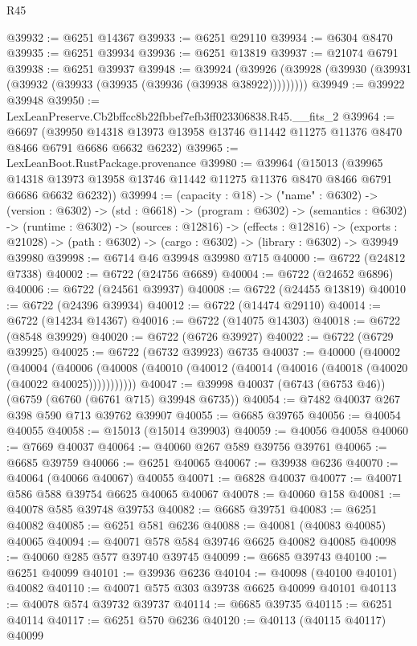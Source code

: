 \begin{lexlean}{R45}
\begin{coremodule}
{@39932 := @6251 @14367
@39933 := @6251 @29110
@39934 := @6304 @8470
@39935 := @6251 @39934
@39936 := @6251 @13819
@39937 := @21074 @6791
@39938 := @6251 @39937
@39948 := @39924
    (@39926 (@39928 (@39930 (@39931 (@39932 (@39933 (@39935 (@39936 (@39938 @38922)))))))))
@39949 := @39922 @39948
@39950 := LexLeanPreserve.Cb2bffcc8b22fbbef7efb3ff023306838.R45.__fits_2
@39964 := @6697
    (@39950 @14318 @13973 @13958 @13746 @11442 @11275 @11376 @8470 @8466 @6791 @6686 @6632 @6232)
@39965 := LexLeanBoot.RustPackage.provenance
@39980 := @39964
    (@15013
      (@39965 @14318 @13973 @13958 @13746 @11442 @11275 @11376 @8470 @8466 @6791 @6686 @6632 @6232))
@39994 := (capacity : @18) ->
  ("name" : @6302) ->
  (version : @6302) ->
  (std : @6618) ->
  (program : @6302) ->
  (semantics : @6302) ->
  (runtime : @6302) ->
  (sources : @12816) ->
  (effects : @12816) ->
  (exports : @21028) -> (path : @6302) -> (cargo : @6302) -> (library : @6302) -> @39949 @39980
@39998 := @6714 @46 @39948 @39980 @715
@40000 := @6722 (@24812 @7338)
@40002 := @6722 (@24756 @6689)
@40004 := @6722 (@24652 @6896)
@40006 := @6722 (@24561 @39937)
@40008 := @6722 (@24455 @13819)
@40010 := @6722 (@24396 @39934)
@40012 := @6722 (@14474 @29110)
@40014 := @6722 (@14234 @14367)
@40016 := @6722 (@14075 @14303)
@40018 := @6722 (@8548 @39929)
@40020 := @6722 (@6726 @39927)
@40022 := @6722 (@6729 @39925)
@40025 := @6722 (@6732 @39923) @6735
@40037 := @40000
    (@40002
      (@40004
        (@40006 (@40008 (@40010 (@40012 (@40014 (@40016 (@40018 (@40020 (@40022 @40025)))))))))))
@40047 := @39998 @40037 (@6743 (@6753 @46)) (@6759 (@6760 (@6761 @715) @39948 @6735))
@40054 := @7482 @40037 @267 @398 @590 @713 @39762 @39907
@40055 := @6685 @39765
@40056 := @40054 @40055
@40058 := @15013 (@15014 @39903)
@40059 := @40056 @40058
@40060 := @7669 @40037
@40064 := @40060 @267 @589 @39756 @39761
@40065 := @6685 @39759
@40066 := @6251 @40065
@40067 := @39938 @6236
@40070 := @40064 (@40066 @40067) @40055
@40071 := @6828 @40037
@40077 := @40071 @586 @588 @39754 @6625 @40065 @40067
@40078 := @40060 @158
@40081 := @40078 @585 @39748 @39753
@40082 := @6685 @39751
@40083 := @6251 @40082
@40085 := @6251 @581 @6236
@40088 := @40081 (@40083 @40085) @40065
@40094 := @40071 @578 @584 @39746 @6625 @40082 @40085
@40098 := @40060 @285 @577 @39740 @39745
@40099 := @6685 @39743
@40100 := @6251 @40099
@40101 := @39936 @6236
@40104 := @40098 (@40100 @40101) @40082
@40110 := @40071 @575 @303 @39738 @6625 @40099 @40101
@40113 := @40078 @574 @39732 @39737
@40114 := @6685 @39735
@40115 := @6251 @40114
@40117 := @6251 @570 @6236
@40120 := @40113 (@40115 @40117) @40099
}
\end{coremodule}
\end{lexlean}
